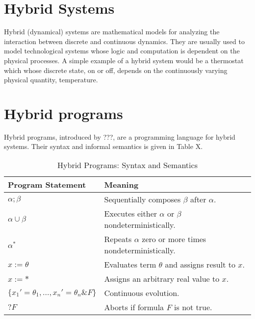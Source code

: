 \documentclass[sigconf,screen]{acmart}
\begin{document}
%



% 
\appendix

\section{Hybrid Systems}
Hybrid (dynamical) systems are mathematical models for analyzing the interaction between discrete and continuous dynamics. They are usually used to model technological systems whose logic and computation is dependent on the physical processes. A simple example of a hybrid system would be a thermostat which whose discrete state, on or off, depends on the continuously varying physical quantity, temperature.

\section{Hybrid programs}

Hybrid programs, introduced by ???, are a programming language for hybrid systems. Their syntax and informal semantics is given in Table X.
\begin{table}
  \caption{Hybrid Programs: Syntax and Semantics} \label{tab:hps}
  \begin{tabular}{l l}
    \toprule
    Program Statement & Meaning \\
    \midrule
    $\alpha;\beta$ & Sequentially composes $\beta$ after $\alpha$. \\
    $\alpha \cup \beta$ & Executes either $\alpha$ or $\beta$ nondeterministically.\\
    $\alpha^*$ & Repeats $\alpha$ zero or more times nondeterministically.\\
    $x := \theta$ & Evaluates term $\theta$ and assigns result to $x$. \\
    $x := *$ & Assigns an arbitrary real value to $x$. \\
    $\{x_1'=\theta_1,...,x_n'=\theta_n \& F\}$ & Continuous evolution\footnotemark. \\
    $?F$ & Aborts if formula $F$ is not true.\\
    \bottomrule
  \end{tabular}
\end{table}
  
\end{document}
